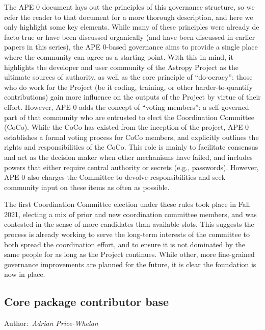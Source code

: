 \documentclass[modern]{aastex631}
\newcommand{\secauthor}[1]{{\color{blue}Author:~\textit{#1}}}
\begin{document}
The APE 0 \citep{ape0} document lays out the principles of this governance
structure, so we refer the reader to that document for a more thorough
description, and here we only highlight some key elements. While many of these
principles were already de facto true or have been discussed organically (and
have been discussed in earlier papers in this series), the APE 0-based governance
aims to provide a single place where the community can agree as a starting
point. With this in mind, it highlights the developer and user community of the
Astropy Project as the ultimate sources of authority, as well as the core
principle of ``do-ocracy'': those who do work for the Project (be it coding,
training, or other harder-to-quantify contributions) gain more influence on the
outputs of the Project by virtue of their effort. However, APE 0 adds the
concept of ``voting members'': a self-governed part of that community who are
entrusted to elect the Coordination Committee (CoCo). While the CoCo has existed
from the inception of the project, APE 0 establishes a formal voting process for
CoCo members, and explicitly outlines the rights and responsibilities of the
CoCo. This role is mainly to facilitate consensus and act as the decision maker
when other mechanisms have failed, and includes powers that either
require central authority or secrets (e.g., passwords). However, APE 0 also
charges the Committee to devolve responsibilities and seek community input on
these items as often as possible.

The first Coordination Committee election under these rules took place in Fall
2021, electing a mix of prior and new coordination committee members,
and was contested in the sense of more candidates than available slots. This
suggests the process is already working to serve the long-term interests of the
committee to both spread the coordination effort, and to ensure it is not
dominated by the same people for as long as the Project continues. While other,
more fine-grained governance improvements are planned for the future, it is
clear the foundation is now in place.


\subsection{Core package contributor base} \label{sec:project-contributors}

\secauthor{Adrian Price-Whelan}

\end{document}
